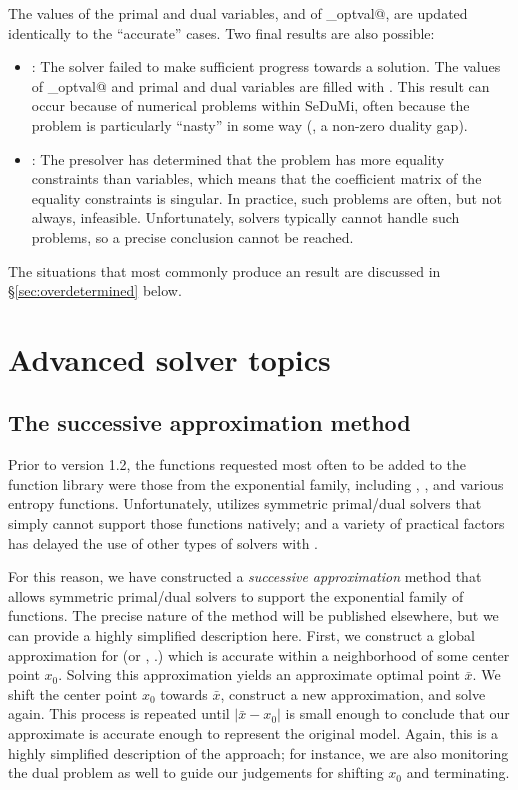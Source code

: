 \documentclass[12pt]{article}
\begin{document}
The values of the primal and dual variables, and of \verb@cvx_optval@, are updated
identically to the ``accurate'' cases. Two final results are also possible:
\begin{itemize}
	\item \verb@Failed@: The solver failed to make sufficient progress towards
	      a solution. The values of \verb@cvx_optval@ and primal and dual
	      variables are filled with \verb@NaN@s. This result can occur because
	      of numerical problems within SeDuMi, often because the problem
	      is particularly ``nasty'' in some way (\eg, a non-zero duality gap).
	\item \verb@Overdetermined@: The presolver has determined that the problem
	      has more equality constraints than variables, which means that the coefficient
	      matrix of the equality constraints is singular. In practice, such problems are
	      often, but not always, infeasible. Unfortunately, solvers 
	      typically cannot handle such problems, so a precise conclusion
	      cannot be reached.
\end{itemize}
The situations that most commonly produce an \verb@Overdetermined@ result are discussed
in \S\ref{sec:overdetermined} below.

\newpage
\section{Advanced solver topics}

\subsection{The successive approximation method}
\label{sec:succ-approx}

Prior to version 1.2, the functions requested most often to be added to the 
\cvx function library were those from the exponential family,
including \verb@exp@, \verb@log@, and various
entropy functions. Unfortunately, \cvx utilizes symmetric primal/dual solvers 
that simply cannot support those functions natively; and a variety of practical
factors has delayed the use of other types of solvers with \cvx.

For this reason, we have constructed a \emph{successive approximation} method
that allows symmetric primal/dual solvers to support the exponential family
of functions. The precise nature of the method will be published elsewhere, but
we can provide a highly simplified description here. First, 
we construct a global approximation for \verb@exp@ (or \verb@log@,
\etc.) which is accurate within a neighborhood of some center point $x_0$.
Solving this approximation yields an approximate optimal point $\bar{x}$. We
shift the center point $x_0$ towards $\bar{x}$, construct a new approximation,
and solve again. This process is repeated until $|\bar{x}-x_0|$ is small enough to conclude
that our approximate is accurate enough to represent the original model.
Again, this is a highly simplified description of the approach; for instance, we
are also monitoring the dual problem as well to guide our judgements for shifting
$x_0$ and terminating.
\end{document}
